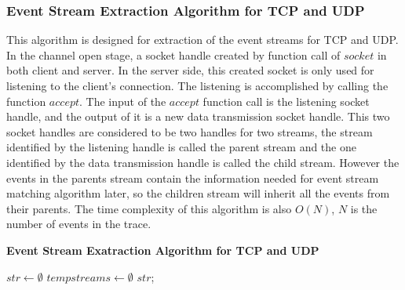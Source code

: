 \subsubsection{Event Stream Extraction Algorithm for TCP and UDP}
This algorithm is designed for extraction of the event streams for TCP and UDP. In the channel open stage, a socket handle created by function call of $socket$ in both client and server. In the server side, this created socket is only used for listening to the client's connection. The listening is accomplished by calling the function $accept$. The input of the $accept$ function call is the listening socket handle, and the output of it is a new data transmission socket handle. This two socket handles are considered to be two handles for two streams, the stream identified by the listening handle is called the parent stream and the one identified by the data transmission handle is called the child stream. However the events in the parents stream contain the information needed for event stream matching algorithm later, so the children stream will inherit all the events from their parents. The time complexity of this algorithm is also $O(N)$, $N$ is the number of events in the trace.

\begin{algorithm}[H]
\DontPrintSemicolon
\caption{{\bf Event Stream Exatraction Algorithm for TCP and UDP} \label{streamext2}}
$str \leftarrow \emptyset$\; 
$tempstreams \leftarrow \emptyset$\;
\KwRet $str$;\;
\end{algorithm} 


